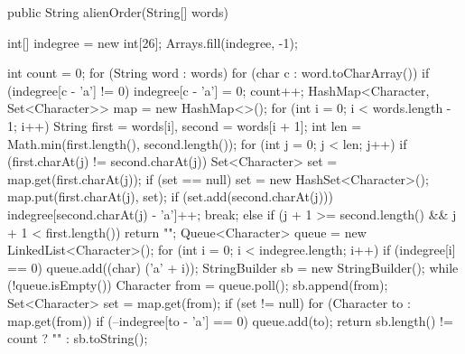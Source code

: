 \begin{Code}
public String alienOrder(String[] words) {
    int[] indegree = new int[26];
    Arrays.fill(indegree, -1);

    int count = 0;
    for (String word : words) {
        for (char c : word.toCharArray()) {
            if (indegree[c - 'a'] != 0) {
                indegree[c - 'a'] = 0;
                count++;
            }
        }
    }
    HashMap<Character, Set<Character>> map = new HashMap<>();
    for (int i = 0; i < words.length - 1; i++) {
        String first = words[i], second = words[i + 1];
        int len = Math.min(first.length(), second.length());
        for (int j = 0; j < len; j++) {
            if (first.charAt(j) != second.charAt(j)) {
                Set<Character> set = map.get(first.charAt(j));
                if (set == null) {
                    set = new HashSet<Character>();
                    map.put(first.charAt(j), set);
                }
                if (set.add(second.charAt(j))) {
                    indegree[second.charAt(j) - 'a']++;
                }
                break;
            } else {
                if (j + 1 >= second.length() && j + 1 < first.length()) { return ""; }
            }
        }
    }
    Queue<Character> queue = new LinkedList<Character>();
    for (int i = 0; i < indegree.length; i++) {
        if (indegree[i] == 0) {
            queue.add((char) ('a' + i));
        }
    }
    StringBuilder sb = new StringBuilder();
    while (!queue.isEmpty()) {
        Character from = queue.poll();
        sb.append(from);
        Set<Character> set = map.get(from);
        if (set != null) {
            for (Character to : map.get(from)) {
                if (--indegree[to - 'a'] == 0) {
                    queue.add(to);
                }
            }
        }
    }
    return sb.length() != count ? "" : sb.toString();
}
\end{Code}